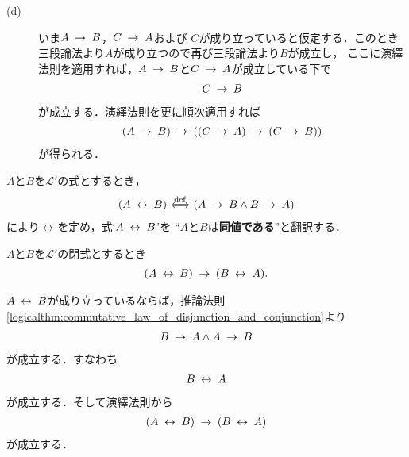 \begin{prf}
\begin{description}
			\item[(d)]
				いま$A \rarrow B$，$C \rarrow A$および
				$C$が成り立っていると仮定する．このとき三段論法より$A$が成り立つので再び三段論法より$B$が成立し，
				ここに演繹法則を適用すれば，$A \rarrow B$と$C \rarrow A$が成立している下で
				\begin{align}
					C \rarrow B
				\end{align}
				が成立する．演繹法則を更に順次適用すれば
				\begin{align}
					(A \rarrow B) \rarrow ( (C \rarrow A) \rarrow (C \rarrow B) )
				\end{align}
				が得られる．
				\QED
		\end{description}
	\end{prf}
	
	$A$と$B$を$\mathcal{L}'$の式とするとき，
	\begin{align}
		(A \lrarrow B) \defarrow
		(A \rarrow B \wedge B \rarrow A)
	\end{align}
	により$\lrarrow$を定め，式`$A \lrarrow B$'を
	``$A$と$B$は{\bf 同値である}''と翻訳する．
	
	\begin{screen}
		\begin{logicalthm}[同値記号の可換律]\label{logicalthm:commutative_law_of_equivalence}
			$A$と$B$を$\mathcal{L}'$の閉式とするとき
			\begin{align}
				(A \lrarrow B) \rarrow (B \lrarrow A).
			\end{align}
		\end{logicalthm}
	\end{screen}
	
	\begin{sketch}
		$A \lrarrow B$が成り立っているならば，推論法則\ref{logicalthm:commutative_law_of_disjunction_and_conjunction}より
		\begin{align}
			B \rarrow A \wedge A \rarrow B
		\end{align}
		が成立する．すなわち
		\begin{align}
			B \lrarrow A
		\end{align}
		が成立する．そして演繹法則から
		\begin{align}
			(A \lrarrow B) \rarrow (B \lrarrow A)
		\end{align}
		が成立する．
		\QED
	\end{sketch}
	
